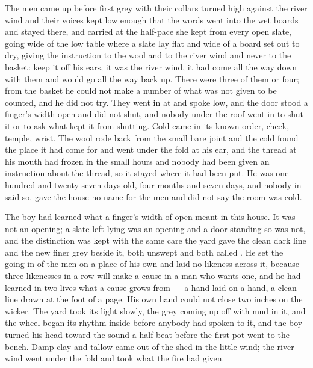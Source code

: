
The men came up  before first grey with their collars turned high against the river wind and their voices kept low enough that the words went into the wet boards and stayed there, and  carried  at the half-pace she kept from every open slate, going wide of the low table where a slate lay flat and wide of a board set out to dry, giving the instruction to the wool and to the river wind and never to the basket: keep it off his ears, it was the river wind, it had come all the way down with them and would go all the way back up. There were three of them or four; from the basket he could not make a number of what was not given to be counted, and he did not try. They went in at  and spoke low, and the door stood a finger's width open and did not shut, and nobody under the roof went in to shut it or to ask what kept it from shutting. Cold came in its known order, cheek, temple, wrist. The wool rode back from the small bare joint and the cold found the place it had come for and went under the fold at his ear, and the thread at his mouth had frozen in the small hours and nobody had been given an instruction about the thread, so it stayed where it had been put. He was one hundred and twenty-seven days old, four months and seven days, and nobody in  said so.  gave the house no name for the men and did not say the room was cold.

The boy had learned what a finger's width of open meant in this house. It was not an opening; a slate left lying was an opening and a door standing so was not, and the distinction was kept with the same care the yard gave the clean dark line and the new finer grey beside it, both unswept and both called . He set the going-in of the men on a place of his own and laid no likeness across it, because three likenesses in a row will make a cause in a man who wants one, and he had learned in two lives what a cause grows from --- a hand laid on a hand, a clean line drawn at the foot of a page. His own hand could not close two inches on the wicker. The yard took its light slowly, the grey coming up off  with mud in it, and the wheel began its rhythm inside  before anybody had spoken to it, and the boy turned his head toward the sound a half-beat before the first pot went to the bench. Damp clay and tallow came out of the shed in the little wind; the river wind went under the fold and took what the fire had given.

